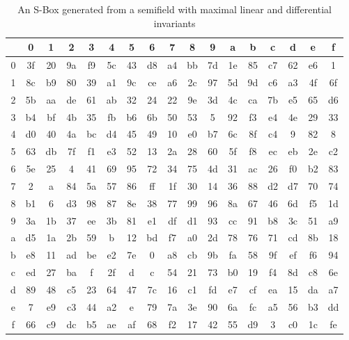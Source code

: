 \documentclass{article}\usepackage{amsthm}
\newcommand{\SBox}{S-Box\xspace}
\begin{document}
\begin{table}[htb]\center
\begin{tabular}{|c||c|c|c|c|c|c|c|c|c|c|c|c|c|c|c|c|}
  \hline
  & 0 & 1 &2 &3 &4 &5&6&7&8&9&a&b&c&d&e&f \\
  \hline
  \hline
  0&  3f & 20 & 9a & f9 & 5c & 43 & d8 & a4 & bb & 7d & 1e & 85 & c7 & 62 & e6 & 1  \\ \hline
  1&  8c & b9 & 80 & 39 & a1 & 9c & ce & a6 & 2c & 97 & 5d & 9d & c6 & a3 & 4f & 6f \\ \hline
  2&  5b & aa & de & 61 & ab & 32 & 24 & 22 & 9e & 3d & 4c & ca & 7b & e5 & 65 & d6 \\ \hline
  3&  b4 & bf & 4b & 35 & fb & b6 & 6b & 50 & 53 & 5 & 92 & f3 & e4 & 4e & 29 & 33 \\ \hline
  4&  d0 & 40 & 4a & bc & d4 & 45 & 49 & 10 & e0 & b7 & 6c & 8f & c4 & 9 & 82 & 8 \\ \hline
  5&  63 & db & 7f & f1 & e3 & 52 & 13 & 2a & 28 & 60 & 5f & f8 & ec & eb & 2e & c2 \\ \hline
  6&  5e & 25 & 4 & 41 & 69 & 95 & 72 & 34 & 75 & 4d & 31 & ac & 26 & f0 & b2 & 83 \\ \hline
  7&  2 & a & 84 & 5a & 57 & 86 & ff & 1f & 30 & 14 & 36 & 88 & d2 & d7 & 70 & 74 \\ \hline
  8&  b1 & 6 & d3 & 98 & 87 & 8e & 38 & 77 & 99 & 96 & 8a & 67 & 46 & 6d & f5 & 1d \\ \hline
  9&  3a & 1b & 37 & ee & 3b & 81 & e1 & df & d1 & 93 & cc & 91 & b8 & 3c & 51 & a9 \\ \hline
  a&  d5 & 1a & 2b & 59 & b & 12 & bd & f7 & a0 & 2d & 78 & 76 & 71 & cd & 8b & 18 \\ \hline
  b&  e8 & 11 & ad & be & e2 & 7e & 0 & a8 & cb & 9b & fa & 58 & 9f & ef & f6 & 94 \\ \hline
  c&  ed & 27 & ba & f & 2f & d & c & 54 & 21 & 73 & b0 & 19 & f4 & 8d & c8 & 6e \\ \hline
  d&  89 & 48 & c5 & 23 & 64 & 47 & 7c & 16 & c1 & fd & e7 & cf & ea & 15 & da & a7 \\ \hline
  e&  7 & e9 & c3 & 44 & a2 & e & 79 & 7a & 3e & 90 & 6a & fc & a5 & 56 & b3 & dd \\ \hline
  f&  66 & c9 & dc & b5 & ae & af & 68 & f2 & 17 & 42 & 55 & d9 & 3 & c0 & 1c & fe \\ \hline

\end{tabular} 
\caption{An \SBox generated from a semifield with maximal linear and differential invariants}\label{tab:23016}
\end{table}
\end{document}
